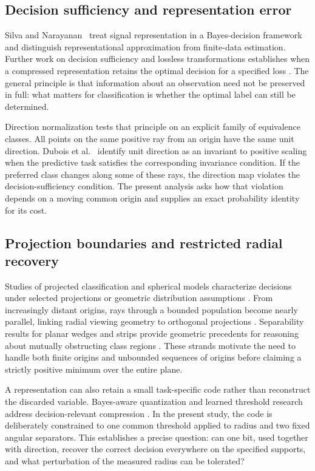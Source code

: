 \documentclass[12pt,a4paper]{article}
\begin{document}
\subsection{Decision sufficiency and representation error}
Silva and Narayanan~\citep{Silva2012} treat signal representation in a Bayes-decision framework and distinguish representational approximation from finite-data estimation. Further work on decision sufficiency and lossless transformations establishes when a compressed representation retains the optimal decision for a specified loss \citep{Silva2024,Gyorfi2023,Silva2025}. The general principle is that information about an observation need not be preserved in full: what matters for classification is whether the optimal label can still be determined.

Direction normalization tests that principle on an explicit family of equivalence classes. All points on the same positive ray from an origin have the same unit direction. Dubois et al.~\citep{Dubois2021} identify unit direction as an invariant to positive scaling when the predictive task satisfies the corresponding invariance condition. If the preferred class changes along some of these rays, the direction map violates the decision-sufficiency condition. The present analysis asks how that violation depends on a moving common origin and supplies an exact probability identity for its cost.

\subsection{Projection boundaries and restricted radial recovery}
Studies of projected classification and spherical models characterize decisions under selected projections or geometric distribution assumptions \citep{Hamsici2007,Hamsici2008,Oh2025}. From increasingly distant origins, rays through a bounded population become nearly parallel, linking radial viewing geometry to orthogonal projections \citep{Orponen2019}. Separability results for planar wedges and strips provide geometric precedents for reasoning about mutually obstructing class regions \citep{Hurtado2001}. These strands motivate the need to handle both finite origins and unbounded sequences of origins before claiming a strictly positive minimum over the entire plane.

A representation can also retain a small task-specific code rather than reconstruct the discarded variable. Bayes-aware quantization and learned threshold research address decision-relevant compression \citep{OehlerGray1995,Senozan2024}. In the present study, the code is deliberately constrained to one common threshold applied to radius and two fixed angular separators. This establishes a precise question: can one bit, used together with direction, recover the correct decision everywhere on the specified supports, and what perturbation of the measured radius can be tolerated?
\end{document}
